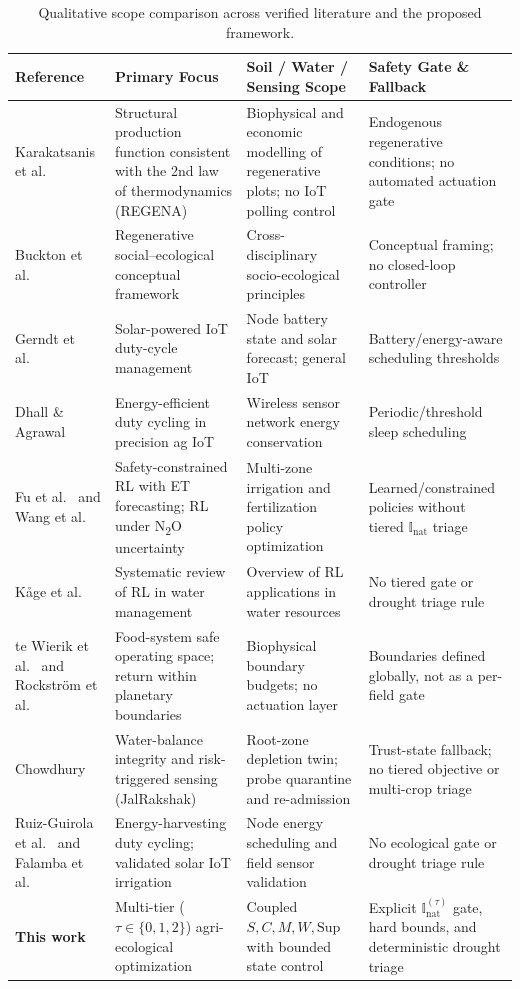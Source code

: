 \documentclass[11pt,a4paper]{article}
\newcommand{\Inat}{\mathbb{I}_{\mathrm{nat}}}
\begin{document}
\begin{table}[t]
  \centering
  \small
  \caption{Qualitative scope comparison across verified literature and the proposed framework.}
  \label{tab:lit_comparison}
  \begin{tabular}{@{}p{3.4cm}p{3.6cm}p{3.6cm}p{3.6cm}@{}}
    \toprule
    \textbf{Reference} & \textbf{Primary Focus} & \textbf{Soil / Water / Sensing Scope} & \textbf{Safety Gate \& Fallback} \\
    \midrule
    Karakatsanis et al.~\cite{karakatsanis_2026} & Structural production function consistent with the 2nd law of thermodynamics (REGENA) & Biophysical and economic modelling of regenerative plots; no IoT polling control & Endogenous regenerative conditions; no automated actuation gate \\
    Buckton et al.~\cite{buckton_2023} & Regenerative social--ecological conceptual framework & Cross-disciplinary socio-ecological principles & Conceptual framing; no closed-loop controller \\
    Gerndt et al.~\cite{gerndt_2025} & Solar-powered IoT duty-cycle management & Node battery state and solar forecast; general IoT & Battery/energy-aware scheduling thresholds \\
    Dhall \& Agrawal~\cite{dhall_2018} & Energy-efficient duty cycling in precision ag IoT & Wireless sensor network energy conservation & Periodic/threshold sleep scheduling \\
    Fu et al.~\cite{water_2026} and Wang et al.~\cite{agrieng_2025} & Safety-constrained RL with ET forecasting; RL under N\textsubscript{2}O uncertainty & Multi-zone irrigation and fertilization policy optimization & Learned/constrained policies without tiered $\Inat$ triage \\
    K{\aa}ge et al.~\cite{frontiers_water_2025} & Systematic review of RL in water management & Overview of RL applications in water resources & No tiered gate or drought triage rule \\
    te Wierik et al.~\cite{sos_food_2025} and Rockstr\"om et al.~\cite{ca_boundaries_2026} & Food-system safe operating space; return within planetary boundaries & Biophysical boundary budgets; no actuation layer & Boundaries defined globally, not as a per-field gate \\
    Chowdhury~\cite{jalrakshak_2026} & Water-balance integrity and risk-triggered sensing (JalRakshak) & Root-zone depletion twin; probe quarantine and re-admission & Trust-state fallback; no tiered objective or multi-crop triage \\
    Ruiz-Guirola et al.~\cite{iot_wakeup_2026} and Falamba et al.~\cite{solar_iot_2026} & Energy-harvesting duty cycling; validated solar IoT irrigation & Node energy scheduling and field sensor validation & No ecological gate or drought triage rule \\
    \textbf{This work} & Multi-tier ($\tau \in \{0,1,2\}$) agri-ecological optimization & Coupled $S, C, M, W, \mathrm{Sup}$ with bounded state control & Explicit $\Inat^{(\tau)}$ gate, hard bounds, and deterministic drought triage \\
    \bottomrule
  \end{tabular}
\end{table}
\end{document}
